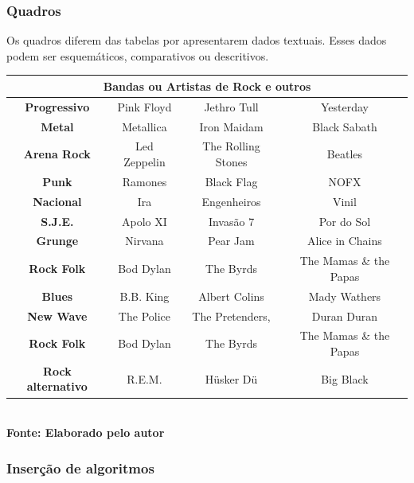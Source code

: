 \estrutura\subsubsection{\esp Quadros}\instrucao

Os quadros diferem das tabelas por apresentarem dados textuais.
Esses dados podem ser esquemáticos, comparativos ou descritivos.
  	
   	\begin{quadro}[H]
   		\centering
   		\caption{Bandas/Artistas de Rock e outros}
   	\label{qua:quadro1}
	\begin{tabular}{|c|c|c|c|} \hline
	\multicolumn{4}{|c|}{\textbf{Bandas ou Artistas de Rock e outros}} 	  \\ 
		\hline \textbf{	Progressivo} & Pink Floyd & Jethro Tull	& Yesterday \\ 
		 \hline \textbf{ Metal}  & Metallica & Iron Maidam & Black Sabath \\ 
		\hline \textbf{	Arena Rock} & Led Zeppelin & The Rolling Stones & Beatles \\ 
		\hline \textbf{ Punk} & Ramones & Black Flag & NOFX	\\ 
		\hline \textbf{	Nacional} & Ira & Engenheiros & Vinil	\\ 
		\hline \textbf{	S.J.E.} & Apolo XI & Invasão 7 & Por do Sol \\ 
		\hline \textbf{	Grunge} & Nirvana & Pear Jam & Alice in Chains	\\ 
		\hline \textbf{	Rock Folk} & Bod Dylan & The Byrds &  The Mamas \& the Papas \\
		\hline \textbf{	Blues} & B.B. King & Albert Colins & Mady Wathers \\ 
		\hline \textbf{	New Wave} & The Police & The Pretenders, &  Duran Duran\\ 
 		\hline \textbf{	Rock Folk} & Bod Dylan & The Byrds &  The Mamas \& the Papas \\
 		\hline \textbf{	Rock alternativo} & R.E.M.& Hüsker Dü & Big Black\\ 
		\hline
	\end{tabular}
	\vspace{.1cm}  %
	\small
	{\footnotesize\\ \textbf{Fonte: Elaborado pelo autor}}
   \end{quadro}

   
\estrutura\subsubsection{\esp Inserção de algoritmos}\instrucao

